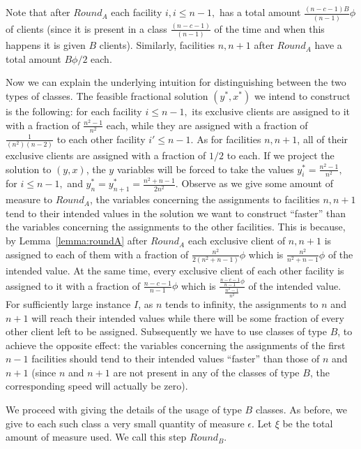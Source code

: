\documentclass[11pt]{article}
\begin{document}
Note that  after $Round_A$ each  facility $i, i  \leq n-1,$ has  a total
amount $ \frac{(n-c-1)B}{(n-1)} \phi$  of clients (since it is present
in a class  $\frac{(n-c-1)}{(n-1)}$ of the time and  when this happens
it is  given $B$ clients).  Similarly, facilities $n,n+1$  after $Round_A$
have a total amount $B\phi /2$ each.

Now we can explain the underlying intuition for distinguishing between
the two
types of classes.  The feasible fractional solution $(y^*,x^*)$
we  intend to  construct is  the following:  for each
facility $ i\leq n-1,$ its exclusive clients are assigned to it with
a fraction of $\frac{n^2-1}{n^2}$ each, while they are assigned with a
fraction of $\frac{1}{(n^2)(n-2)}$ to  each other facility $ i'
\leq  n-1$. As  for facilities  $n,n+1$, all  of their exclusive  clients are
assigned with a fraction of $1/2$  to each.  If  we  project  the solution  to  
 $(y,x)$, the $y$ variables will be forced 
to  take   the  values
$y^*_i=\frac{n^2-1}{n^2},$ for $i \leq n-1,$ and $y^*_n=y^*_{n+1}=\frac{n^2+n-1}{2n^2}$. Observe as we give some  amount of  measure to  $Round_A$,
 the  variables  concerning the
assignments to facilities $n,n+1$ tend to their intended values in the
solution we want to construct ``faster'' than the variables concerning the
assignments to the other facilities. This is because, by Lemma~\ref{lemma:roundA}
after $Round_A$ each exclusive client  of $n,n+1$ is assigned to each of them with
a fraction of $\frac{n^2}{2(n^2+n-1)} \phi$ which is $\frac{n^2}{n^2+n-1}
\phi$ of  the intended value. At the  same time, every
exclusive  client of  each other  facility is  assigned to  it  with a
fraction of $\frac{n-c-1}{n-1} \phi$ which is $\frac{\frac{n-c-1}{n-1}
  \phi}{\frac{n^2-1}{n^2}}$  of the  intended value.  For sufficiently
large  instance  $I$,  as  $n$  tends  to  infinity,  the  assignments
to $n$ and $n+1$ will reach their intended values while there will
be   some    fraction   of   every    other   client   left    to   be
assigned. Subsequently we have to use classes of type $B$, 
to achieve the opposite effect: the
variables  concerning the  assignments of  the first  $n-1$ facilities
should tend
to their intended values ``faster''  than those of $n$ and $n+1$ (since
$n$ and $n+1$  are 
not  present in  any of  the classes  of type  $B$,  the corresponding
speed will actually be zero).

We  proceed  with  giving  the  details  of  the  usage  of  type  $B$
classes. As before,  we give to each such class  a very small quantity
of  measure $\epsilon$.  Let  $\xi$  be the  total  amount of  measure
used. We call this step $Round_B$.
\end{document}
